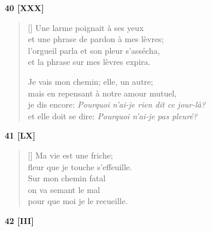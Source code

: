 \documentclass[a4paper,12pt]{book}
\begin{document}
\bigskip

\begin{center}
  \textbf{40 [XXX]}
\end{center}


\begin{verse}[\versewidth]
  Une larme poignait à ses yeux \\
  et une phrase de pardon à mes lèvres; \\
  l'orgueil parla et son pleur s'assécha, \\
  et la phrase sur mes lèvres expira.

  Je vais mon chemin; elle, un autre; \\
  mais en repensant à notre amour mutuel, \\
  je dis encore: \emph{Pourquoi n'ai-je rien dit ce jour-là?} \\
  et elle doit se dire: \emph{Pourquoi n'ai-je pas pleuré?}
\end{verse}

\bigskip

\begin{center}
  \textbf{41 [LX]}
\end{center}

\settowidth{\versewidth}{fleur que je touche s'effeuille.}

\begin{verse}[\versewidth]
  Ma vie est une friche; \\
  fleur que je touche s'effeuille. \\
  Sur mon chemin fatal \\
  on va semant le mal \\
  pour que moi je le recueille.
\end{verse}

\bigskip

\begin{center}
  \textbf{42 [III]}
\end{center}

\settowidth{\versewidth}{comme au travers d'un tulle,}
\end{document}
